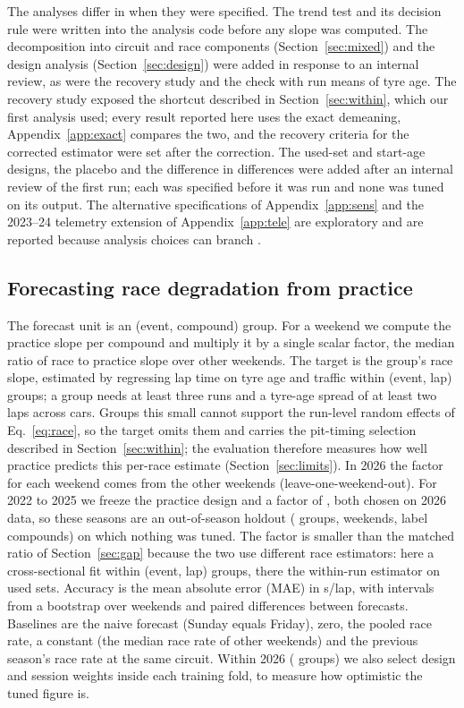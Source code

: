 The analyses differ in when they were specified.
The trend test and its decision rule were written into the analysis code before any slope was computed.
The decomposition into circuit and race components (Section~\ref{sec:mixed}) and the design analysis (Section~\ref{sec:design}) were added in response to an internal review, as were the recovery study and the check with run means of tyre age.
The recovery study exposed the shortcut described in Section~\ref{sec:within}, which our first analysis used; every result reported here uses the exact demeaning, Appendix~\ref{app:exact} compares the two, and the recovery criteria for the corrected estimator were set after the correction.
The used-set and start-age designs, the placebo and the difference in differences were added after an internal review of the first run; each was specified before it was run and none was tuned on its output.
The \MultiverseSpecs{} alternative specifications of Appendix~\ref{app:sens} and the 2023--24 telemetry extension of Appendix~\ref{app:tele} are exploratory and are reported because analysis choices can branch \citep{gelman2014crisis}.

\subsection{Forecasting race degradation from practice}\label{sec:forecast}

The forecast unit is an (event, compound) group.
For a weekend we compute the practice slope per compound and multiply it by a single scalar factor, the median ratio of race to practice slope over other weekends.
The target is the group's race slope, estimated by regressing lap time on tyre age and traffic within (event, lap) groups; a group needs at least three runs and a tyre-age spread of at least two laps across cars.
Groups this small cannot support the run-level random effects of Eq.~\eqref{eq:race}, so the target omits them and carries the pit-timing selection described in Section~\ref{sec:within}; the evaluation therefore measures how well practice predicts this per-race estimate (Section~\ref{sec:limits}).
In 2026 the factor for each weekend comes from the other weekends (leave-one-weekend-out).
For 2022 to 2025 we freeze the practice design and a factor of \FrozenFactor, both chosen on 2026 data, so these seasons are an out-of-season holdout (\HoldoutCells{} groups, \HoldoutWeekends{} weekends, label compounds) on which nothing was tuned.
The factor is smaller than the matched ratio of Section~\ref{sec:gap} because the two use different race estimators: here a cross-sectional fit within (event, lap) groups, there the within-run estimator on used sets.
Accuracy is the mean absolute error (MAE) in s/lap, with intervals from a bootstrap over weekends and paired differences between forecasts.
Baselines are the naive forecast (Sunday equals Friday), zero, the pooled race rate, a constant (the median race rate of other weekends) and the previous season's race rate at the same circuit.
Within 2026 (\TwentySixCells{} groups) we also select design and session weights inside each training fold, to measure how optimistic the tuned figure is.
